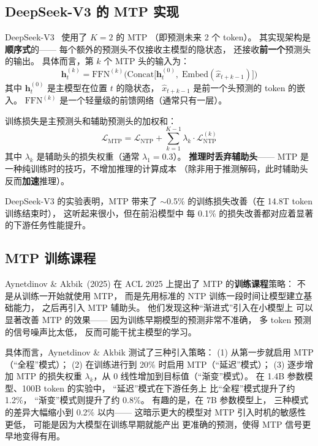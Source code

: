 \subsection{DeepSeek-V3 的 MTP 实现}

DeepSeek-V3~\cite{deepseekv3} 使用了 $K = 2$ 的 MTP
（即预测未来 2 个 token）。
其实现架构是\textbf{顺序式}的——
每个额外的预测头不仅接收主模型的隐状态，
还接收\textbf{前一个}预测头的输出。
具体而言，第 $k$ 个 MTP 头的输入为：
\begin{equation}
  \mathbf{h}_t^{(k)} = \mathrm{FFN}^{(k)}\bigl(
    \mathrm{Concat}\bigl[\mathbf{h}_t^{(0)},\;
    \mathrm{Embed}(\hat{x}_{t+k-1})\bigr]
  \bigr)
  \label{eq:mtp-head}
\end{equation}
其中 $\mathbf{h}_t^{(0)}$ 是主模型在位置 $t$ 的隐状态，
$\hat{x}_{t+k-1}$ 是前一个头预测的 token 的嵌入。
$\mathrm{FFN}^{(k)}$ 是一个轻量级的前馈网络（通常只有一层）。

训练损失是主预测头和辅助预测头的加权和：
\begin{equation}
  \mathcal{L}_{\mathrm{MTP}} = \mathcal{L}_{\mathrm{NTP}}
  + \sum_{k=1}^{K-1} \lambda_k \cdot \mathcal{L}_{\mathrm{NTP}}^{(k)}
  \label{eq:mtp-loss}
\end{equation}
其中 $\lambda_k$ 是辅助头的损失权重（通常 $\lambda_1 = 0.3$）。
\textbf{推理时丢弃辅助头}——
MTP 是一种纯训练时的技巧，不增加推理的计算成本
（除非用于推测解码，此时辅助头反而\textbf{加速}推理）。

DeepSeek-V3 的实验表明，MTP 带来了
$\sim$0.5\% 的训练损失改善（在 14.8T token 训练结束时），
这听起来很小，但在前沿模型中
每 0.1\% 的损失改善都对应着显著的下游任务性能提升。

\subsection{MTP 训练课程}

Aynetdinov \& Akbik~(2025)%
在 ACL 2025 上提出了 MTP 的\textbf{训练课程}策略：
不是从训练一开始就使用 MTP，
而是先用标准的 NTP 训练一段时间让模型建立基础能力，
之后再引入 MTP 辅助头。
他们发现这种``渐进式''引入在小模型上
可以显著改善 MTP 的效果——
因为训练早期模型的预测非常不准确，
多 token 预测的信号噪声比太低，
反而可能干扰主模型的学习。

具体而言，Aynetdinov \& Akbik 测试了三种引入策略：
(1) 从第一步就启用 MTP（``全程''模式）；
(2) 在训练进行到 20\% 时启用 MTP（``延迟''模式）；
(3) 逐步增加 MTP 的损失权重
$\lambda_k$，从 0 线性增加到目标值（``渐变''模式）。
在 1.4B 参数模型、100B token 的实验中，
``延迟''模式在下游任务上
比``全程''模式提升了约 1.2\%，
``渐变''模式则提升了约 0.8\%。
有趣的是，在 7B 参数模型上，
三种模式的差异大幅缩小到 0.2\% 以内——
这暗示更大的模型对 MTP 引入时机的敏感性更低，
可能是因为大模型在训练早期就能产出
更准确的预测，使得 MTP 信号更早地变得有用。

